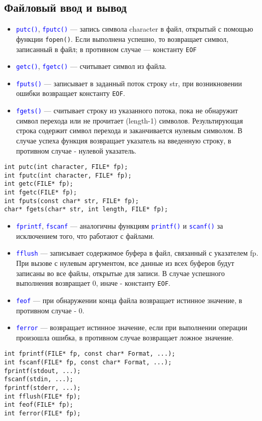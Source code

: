 \documentclass {article}
\begin{document}
\subsection{Файловый ввод и вывод}
\begin{itemize}
\item \textcolor{blue}{\texttt{putc()}}, \textcolor{blue}{\texttt{fputc()}} --- запись символа character в файл, открытый с помощью функции \texttt{fopen()}. Если выполнена успешно, то возвращает символ, записанный в файл; в противном случае --- константу \texttt{EOF}
\item \textcolor{blue}{\texttt{getc()}}, \textcolor{blue}{\texttt{fgetc()}} --- считывает символ из файла.
\item  \textcolor{blue}{\texttt{fputs()}} --- записывает в заданный поток строку str, при возникновении ошибки возвращает константу \texttt{EOF}.
\item \textcolor{blue}{\texttt{fgets()}} --- считывает строку из указанного потока, пока не обнаружит символ перехода или не прочитает (length-1) символов. Результирующая строка содержит символ перехода и заканчивается нулевым символом. В случае успеха функция возвращает указатель на введенную строку, в противном случае - нулевой указатель.
\end{itemize}
\begin{lstlisting}
int putc(int character, FILE* fp);
int fputc(int character, FILE* fp);
int getc(FILE* fp);
int fgetc(FILE* fp);
int fputs(const char* str, FILE* fp);
char* fgets(char* str, int length, FILE* fp);
\end{lstlisting}
\begin{itemize}
\item \textcolor{blue}{\texttt{fprintf}}, \textcolor{blue}{\texttt{fscanf}} --- аналогичны функциям \textcolor{blue}{\texttt{printf()}} и \textcolor{blue}{\texttt{scanf()}} за исключением того, что работают с файлами.
\item \textcolor{blue}{\texttt{fflush}} --- записывает содержимое буфера в файл, связанный с указателем fp. При вызове с нулевым аргументом, все данные из всех буферов будут записаны во все файлы, открытые для записи. 
В случае успешного выполнения возвращает 0, иначе - константу \texttt{EOF}.
\item \textcolor{blue}{\texttt{feof}} --- при обнаружении конца файла возвращает истинное значение, в противном случае - 0.
\item  \textcolor{blue}{\texttt{ferror}} --- возвращает истинное значение, если при выполнении операции произошла ошибка, в противном случае возвращает ложное значение.
\end{itemize}
\begin{lstlisting}
int fprintf(FILE* fp, const char* Format, ...);
int fscanf(FILE* fp, const char* Format, ...);
fprintf(stdout, ...);  
fscanf(stdin, ...);     
fprintf(stderr, ...);    
int fflush(FILE* fp);
int feof(FILE* fp);
int ferror(FILE* fp); 
\end{lstlisting}
\end{document}
